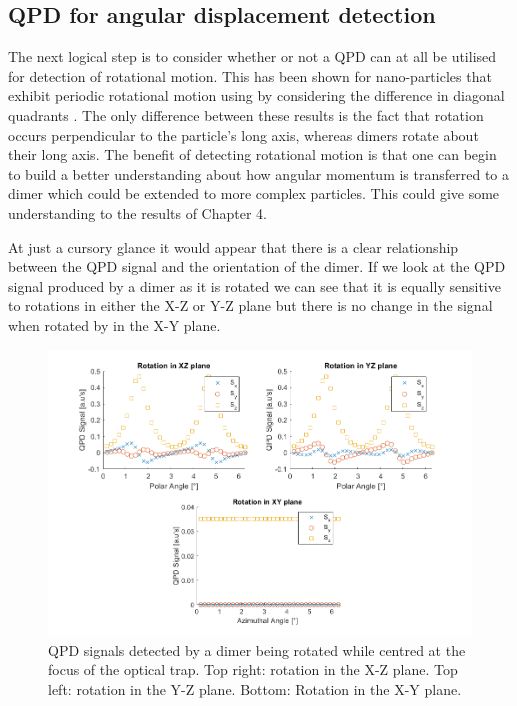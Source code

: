 \subsection{QPD for angular displacement detection}
The next logical step is to consider whether or not a QPD can at 
all be utilised for detection of rotational motion. This has been
shown for nano-particles that exhibit periodic rotational motion
using by considering the difference in diagonal quadrants 
\cite{Yifat2021}. The only difference between these results is 
the fact that rotation occurs perpendicular to the particle's long 
axis, whereas dimers rotate about their long axis. The benefit of 
detecting rotational motion is that one can begin to build a better understanding about how angular momentum is transferred to a dimer 
which could be extended to more complex particles. This could give 
some understanding to the results of Chapter 4. 

At just a cursory glance it would appear that there is a clear
relationship between the QPD signal and the orientation of the 
dimer. If we look at the QPD signal produced by a dimer as it is 
rotated we can see that it is equally sensitive to rotations in
either the X-Z or Y-Z plane but there is no change in the signal 
when rotated by in the X-Y plane. 
\begin{figure}
	\centering
	\includegraphics[width=0.9\linewidth]{rotation_figure.png}
	\caption{QPD signals detected by a dimer being rotated while
		centred at the focus of the optical trap. Top right:
		rotation in the X-Z plane. Top left: rotation in the
		Y-Z plane. Bottom: Rotation in the X-Y plane.}
	\label{fig:QPD_rotation}
\end{figure}

